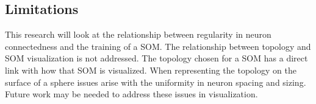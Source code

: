 \documentclass[10pt,titlepage]{article}
\begin{document}
\subsection{Limitations}
This research will look at the relationship between regularity in neuron connectedness
and the training of a SOM. The relationship between topology and SOM visualization is not
addressed. The topology chosen for a SOM has a direct link with how that SOM is
visualized.  When representing the topology on the surface of a sphere issues
arise with the uniformity in neuron spacing and sizing.  Future work may be
needed to address these issues in visualization.








\end{document}

